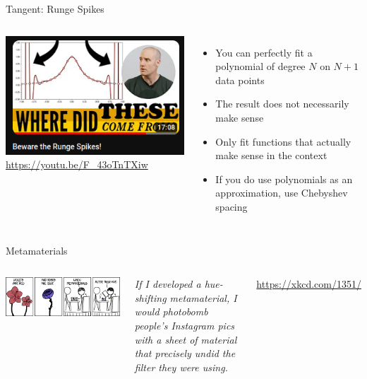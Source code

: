 
\begin{frame}{Tangent: Runge Spikes}
%
\begin{columns}
\includegraphics[width=.8\linewidth]{./gfx/05-runge-spikes}
\url{https://youtu.be/F_43oTnTXiw}
%
\begin{itemize}
\item You can perfectly fit a polynomial of degree $N$ on $N + 1$ data points
\item The result does not necessarily make sense
\item Only fit functions that actually make sense in the context
\item If you do use polynomials as an approximation, use Chebyshev spacing
\end{itemize}
\end{columns}
%
\end{frame}


\begin{frame}{Metamaterials}
%
\begin{columns}
\begin{center}
\includegraphics[width=\linewidth]{./gfx/05-xkcd-metamaterials}\\
\end{center}
%
\small
	\emph{If I developed a hue-shifting metamaterial, I would photobomb people's Instagram pics with a sheet of material that precisely undid the filter they were using.}

	\vspace{6pt}
	\url{https://xkcd.com/1351/}
\end{columns}
%
\end{frame}

